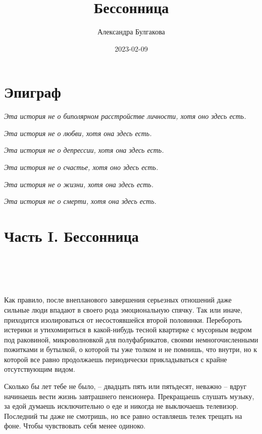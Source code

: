 \documentclass[
]{book}
\title{Бессонница}
\author{Александра Булгакова}
\date{2023-02-09}
\begin{document}
\maketitle

{
\setcounter{tocdepth}{1}
\tableofcontents
}
\hypertarget{ux44dux43fux438ux433ux440ux430ux444}{%
\chapter*{Эпиграф}\label{ux44dux43fux438ux433ux440ux430ux444}}

\emph{Эта история не о биполярном расстройстве личности, хотя оно здесь есть.}

\emph{Эта история не о любви, хотя она здесь есть.}

\emph{Эта история не о депрессии, хотя она здесь есть.}

\emph{Эта история не о счастье, хотя оно здесь есть.}

\emph{Эта история не о жизни, хотя она здесь есть.}

\emph{Эта история не о смерти, хотя она здесь есть.}

\hypertarget{ux447ux430ux441ux442ux44c-i.-ux431ux435ux441ux441ux43eux43dux43dux438ux446ux430}{%
\chapter*{Часть I. Бессонница}\label{ux447ux430ux441ux442ux44c-i.-ux431ux435ux441ux441ux43eux43dux43dux438ux446ux430}}

\hypertarget{chapter-1}{%
\chapter{~}\label{chapter-1}}

Как правило, после внепланового завершения серьезных отношений даже сильные люди впадают в своего рода эмоциональную спячку. Так или иначе, приходится изолироваться от несостоявшейся второй половинки. Перебороть истерики и утихомириться в какой-нибудь тесной квартирке с мусорным ведром под раковиной, микроволновкой для полуфабрикатов, своими немногочисленными пожитками и бутылкой, о которой ты уже толком и не помнишь, что внутри, но к которой все равно продолжаешь периодически прикладываться с крайне отсутствующим видом.

Сколько бы лет тебе не было, -- двадцать пять или пятьдесят, неважно -- вдруг начинаешь вести жизнь завтрашнего пенсионера. Прекращаешь слушать музыку, за едой думаешь исключительно о еде и никогда не выключаешь телевизор. Последний ты даже не смотришь, но все равно оставляешь телек трещать на фоне. Чтобы чувствовать себя менее одиноко.
\end{document}
